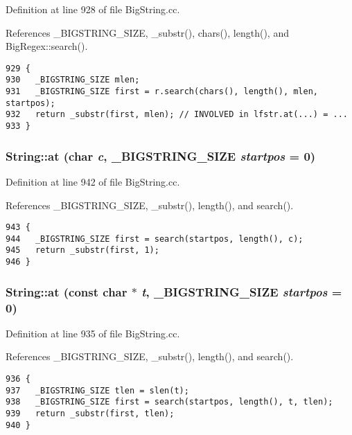 Definition at line 928 of file Big\-String.cc.

References \_\-BIGSTRING\_\-SIZE, \_\-substr(), chars(), length(), and Big\-Regex::search().



\footnotesize\begin{verbatim}929 {
930   _BIGSTRING_SIZE mlen;
931   _BIGSTRING_SIZE first = r.search(chars(), length(), mlen, startpos);
932   return _substr(first, mlen); // INVOLVED in lfstr.at(...) = ...
933 }
\end{verbatim}\normalsize 
{}
\subsubsection{ String::at (char {\em c}, {\bf \_\-BIGSTRING\_\-SIZE} {\em startpos} = 0)}\label{classString_a56}




Definition at line 942 of file Big\-String.cc.

References \_\-BIGSTRING\_\-SIZE, \_\-substr(), length(), and search().



\footnotesize\begin{verbatim}943 {
944   _BIGSTRING_SIZE first = search(startpos, length(), c);
945   return _substr(first, 1);
946 }
\end{verbatim}\normalsize 
{}
\subsubsection{ String::at (const char $\ast$ {\em t}, {\bf \_\-BIGSTRING\_\-SIZE} {\em startpos} = 0)}\label{classString_a55}




Definition at line 935 of file Big\-String.cc.

References \_\-BIGSTRING\_\-SIZE, \_\-substr(), length(), and search().



\footnotesize\begin{verbatim}936 {
937   _BIGSTRING_SIZE tlen = slen(t);
938   _BIGSTRING_SIZE first = search(startpos, length(), t, tlen);
939   return _substr(first, tlen);
940 }
\end{verbatim}\normalsize 
{}
